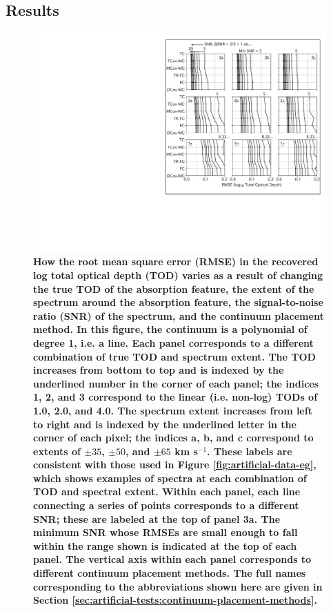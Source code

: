 \documentclass[manuscript]{aastex62}
\begin{document}
{ \bf
\subsection{Results}

\begin{figure}
  \includegraphics[width=\linewidth]{figures/annotated_co1_RMSEs_vs_SNR.pdf}
  \caption{
  \bf
  How the root mean square error (RMSE) in the recovered log total optical depth (TOD) varies as a result of changing the true TOD of the absorption feature, the extent of the spectrum around the absorption feature, the signal-to-noise ratio (SNR) of the spectrum, and the continuum placement method.
  In this figure, the continuum is a polynomial of degree 1, i.e. a line.
  Each panel corresponds to a different combination of true TOD and spectrum extent.
  The TOD increases from bottom to top and is indexed by the underlined number in the corner of each panel; the indices 1, 2, and 3 correspond to the linear (i.e. non-log) TODs of 1.0, 2.0, and 4.0. The spectrum extent increases from left to right and is indexed by the underlined letter in the corner of each pixel; the indices a, b, and c correspond to extents of $\pm 35$, $\pm 50$, and $\pm 65$ km s$^{-1}$. These labels are consistent with those used in Figure \ref{fig:artificial-data-eg}, which shows examples of spectra at each combination of TOD and spectral extent.
  Within each panel, each line connecting a series of points corresponds to a different SNR; these are labeled at the top of panel 3a. The minimum SNR whose RMSEs are small enough to fall within the range shown is indicated at the top of each panel.
  The vertical axis within each panel corresponds to different continuum placement methods. The full names corresponding to the abbreviations shown here are given in Section \ref{sec:artificial-tests:continuum-placement-methods}.
  }
  \label{fig:outcomes-CO-1}
\end{figure}

}
\end{document}
